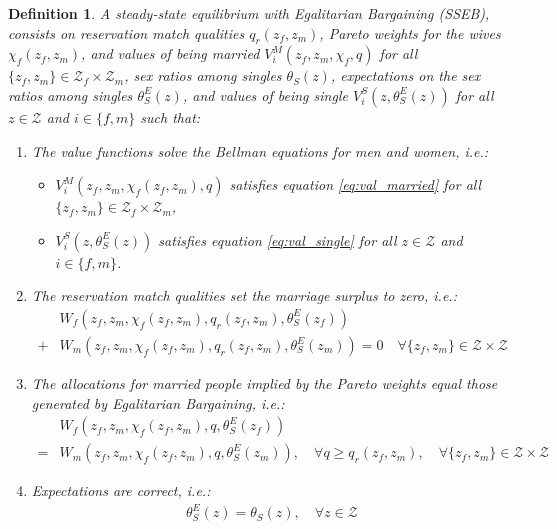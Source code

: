 \documentclass[12pt]{article}
\newtheorem{definition}{Definition}
\begin{document}
\begin{definition}
		A steady-state equilibrium with Egalitarian Bargaining (SSEB), consists on reservation match qualities $q_r\left(z_f,z_m\right)$, Pareto weights for the wives $\chi_f(z_f,z_m)$, and values of being married $V_i^M\left(z_f,z_m,\chi_f,q\right)$ for all $\{z_f,z_m\}\in \mathcal{Z}_f\times \mathcal{Z}_m$, sex ratios among singles $\theta_S(z)$, expectations on the sex ratios among singles $\theta_S^E(z)$, and values of being single $V_i^S\left(z,\theta_{S}^E(z)\right)$ for all $z\in\mathcal{Z}$ and $i\in\{f,m\}$ such that: 
	\begin{enumerate}
		\item The value functions solve the Bellman equations for men and women, i.e.:
		\begin{itemize}
			\item $V_i^M\left(z_f,z_m,\chi_f(z_f,z_m),q\right)$ satisfies equation \ref{eq:val_married} for all $\{z_f,z_m\}\in \mathcal{Z}_f\times \mathcal{Z}_m$,
			\item $V_i^S\left(z,\theta_{S}^E(z)\right)$ satisfies equation \ref{eq:val_single} for all $z\in\mathcal{Z}$ and $i\in\{f,m\}$.
		\end{itemize}  
		\item The reservation match qualities set the marriage surplus to zero, i.e.:
		\begin{align*}
		& W_f\left(z_f,z_m,\chi_f(z_f,z_m),q_r\left(z_f,z_m\right),\theta_S^E(z_f)\right) \\ + & W_m\left(z_f,z_m,\chi_f(z_f,z_m),q_r\left(z_f,z_m\right),\theta_S^E(z_m)\right)=0 \quad \forall \{z_f,z_m\}\in\mathcal{Z}\times\mathcal{Z}
		\end{align*} 
		\item The allocations for married people implied by the Pareto weights equal those generated by Egalitarian Bargaining, i.e.:
		\begin{align*}
		& W_f\left(z_f,z_m,\chi_f(z_f,z_m),q,\theta_S^E(z_f)\right) \\ = & W_m\left(z_f,z_m,\chi_f(z_f,z_m),q,\theta_S^E(z_m)\right), \quad \forall q\geq q_r\left(z_f,z_m\right), \quad \forall\{z_f,z_m\}\in\mathcal{Z}\times\mathcal{Z}
		\end{align*} 
		\item Expectations are correct, i.e.: 
		\begin{align*}
			\theta_{S}^E(z)=\theta_{S}(z), \quad \forall z\in\mathcal{Z}
		\end{align*}
	\end{enumerate}
\end{definition}
\end{document}
